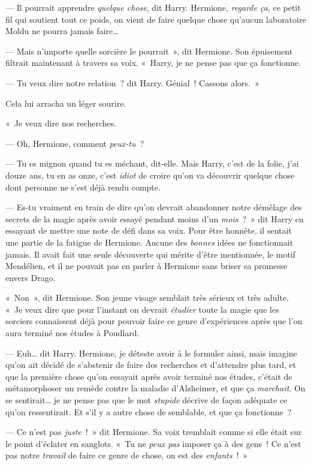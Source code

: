 --- Il pourrait apprendre \emph{quelque chose}, dit Harry.
Hermione, \emph{regarde ça}, ce petit fil qui soutient tout ce poids, on vient de faire quelque chose qu'aucun laboratoire Moldu ne pourra jamais faire…

--- Mais n'importe quelle sorcière le pourrait~», dit Hermione.
Son épuisement filtrait maintenant à travers sa voix.
«~Harry, je ne pense pas que ça fonctionne.

--- Tu veux dire notre relation~? dit Harry.
Génial~!
Cassons alors.~»

Cela lui arracha un léger sourire.

«~Je veux dire nos recherches.

--- Oh, Hermione, comment \emph{peux-tu}~?

--- Tu es mignon quand tu es méchant, dit-elle.
Mais Harry, c'est de la folie, j'ai douze ans, tu en as onze, c'est \emph{idiot} de croire qu'on va découvrir quelque chose dont personne ne s'est déjà rendu compte.

--- Es-tu vraiment en train de dire qu'on devrait abandonner notre démêlage des secrets de la magie après avoir essayé pendant moins d'un \emph{mois}~?~»
dit Harry en essayant de mettre une note de défi dans sa voix.
Pour être honnête, il sentait une partie de la fatigue de Hermione.
Aucune des \emph{bonnes} idées ne fonctionnait jamais.
Il avait fait une seule découverte qui mérite d'être mentionnée, le motif Mendélien, et il ne pouvait pas en parler à Hermione sans briser sa promesse envers Drago.

«~Non~», dit Hermione.
Son jeune visage semblait très sérieux et très adulte.
«~Je veux dire que pour l'instant on devrait \emph{étudier} toute la magie que les sorciers connaissent déjà pour pouvoir faire ce genre d'expériences après que l'on aura terminé nos études à Poudlard.

--- Euh… dit Harry.
Hermione, je déteste avoir à le formuler ainsi, mais imagine qu'on ait décidé de s'abstenir de faire des recherches et d'attendre plus tard, et que la première chose qu'on essayait après avoir terminé nos études, c'était de métamorphoser un remède contre la maladie d'Alzheimer, et que ça \emph{marchait}.
On se sentirait… je ne pense pas que le mot \emph{stupide} décrive de façon adéquate ce qu'on ressentirait.
Et s'il y a autre chose de semblable, et que ça fonctionne~?

--- Ce n'est pas \emph{juste}~!~»
dit Hermione.
Sa voix tremblait comme si elle était sur le point d'éclater en sanglots.
«~Tu ne \emph{peux pas} imposer ça à des gens~!
Ce n'est pas notre \emph{travail} de faire ce genre de chose, on est des \emph{enfants}~!~»

